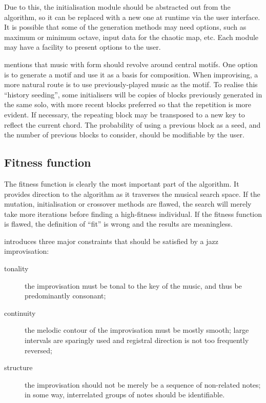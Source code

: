 Due to this, the initialisation module should be abstracted out from the algorithm, so it can be replaced with a new one at runtime via the user interface. It is possible that some of the generation methods may need options, such as maximum or minimum octave, input data for the chaotic map, etc. Each module may have a facility to present options to the user.

\cite{grachten01} mentions that music with form should revolve around central motifs. One option is to generate a motif and use it as a basis for composition. When improvising, a more natural route is to use previously-played music as the motif. To realise this ``history seeding'', some initialisers will be copies of blocks previously generated in the same solo, with more recent blocks preferred so that the repetition is more evident. If necessary, the repeating block may be transposed to a new key to reflect the current chord. The probability of using a previous block as a seed, and the number of previous blocks to consider, should be modifiable by the user.

\subsection{Fitness function} 
\label{ss-des-fitfunc}

The fitness function is clearly the most important part of the algorithm. It provides direction to the algorithm as it traverses the musical search space. If the mutation, initialisation or crossover methods are flawed, the search will merely take more iterations before finding a high-fitness individual. If the fitness function is flawed, the definition of ``fit'' is wrong and the results are meaningless.

\cite{grachten01} introduces three major constraints that should be satisfied by a jazz improvisation:

	\begin{description}
		\item[tonality] the improvisation must be tonal to the key of the music, and thus be predominantly consonant;
		\item[continuity] the melodic contour of the improvisation must be mostly smooth; large intervals are sparingly used and registral direction is not too frequently reversed;
		\item[structure] the improvisation should not be merely be a sequence of non-related notes; in some way, interrelated groups of notes should be identifiable.
	\end{description}
	

